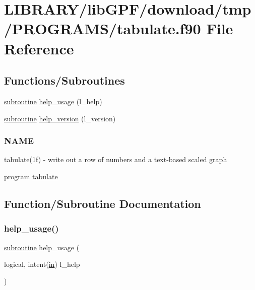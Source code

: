 \hypertarget{tabulate_8f90}{}\section{L\+I\+B\+R\+A\+R\+Y/lib\+G\+P\+F/download/tmp/\+P\+R\+O\+G\+R\+A\+M\+S/tabulate.f90 File Reference}
\label{tabulate_8f90}
\subsection*{Functions/\+Subroutines}
\begin{DoxyCompactItemize}
\item 
\hyperlink{M__stopwatch_83_8txt_acfbcff50169d691ff02d4a123ed70482}{subroutine} \hyperlink{tabulate_8f90_a3e09a3b52ee8fb04eeb93fe5761626a8}{help\+\_\+usage} (l\+\_\+help)
\item 
\hyperlink{M__stopwatch_83_8txt_acfbcff50169d691ff02d4a123ed70482}{subroutine} \hyperlink{tabulate_8f90_a39c21619b08a3c22f19e2306efd7f766}{help\+\_\+version} (l\+\_\+version)
\begin{DoxyCompactList}\small\item\em \subsubsection*{N\+A\+ME}

tabulate(1f) -\/ write out a row of numbers and a text-\/based scaled graph \end{DoxyCompactList}\item 
program \hyperlink{tabulate_8f90_a013be6cecb71296773686ddf56ac1a34}{tabulate}
\end{DoxyCompactItemize}


\subsection{Function/\+Subroutine Documentation}
\mbox{\label{tabulate_8f90_a3e09a3b52ee8fb04eeb93fe5761626a8}} 
\subsubsection{\texorpdfstring{help\+\_\+usage()}{help\_usage()}}
{\footnotesize\ttfamily \hyperlink{M__stopwatch_83_8txt_acfbcff50169d691ff02d4a123ed70482}{subroutine} help\+\_\+usage (\begin{DoxyParamCaption}\item[{logical, intent(\hyperlink{M__journal_83_8txt_afce72651d1eed785a2132bee863b2f38}{in})}]{l\+\_\+help }\end{DoxyParamCaption})}



